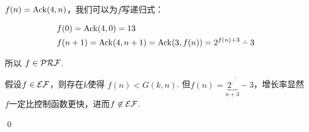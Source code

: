 \begin{pf} \rm 

$f(n) = \mathrm{Ack}(4, n)$，我们可以为$f$写递归式：

$$
\begin{aligned}
& f(0) = \Ack(4, 0) = 13\\
& f(n+1) = \Ack(4, n+1) = \Ack(3, f(n)) = 2^{f(n)+3}\dotminus 3
\end{aligned}
$$

所以 $f\in\mathcal{PRF}$. 

假设$f\in\mathcal{EF}$，则存在$k$使得 $f(n)< G(k, n)$. 但$f(n)=\underbrace{2^{.^{.^{.^{2}}}}}_{n+3}-3$，增长率显然$f$一定比控制函数更快，进而$f\not\in\mathcal{EF}$.


\qed
\end{pf}
